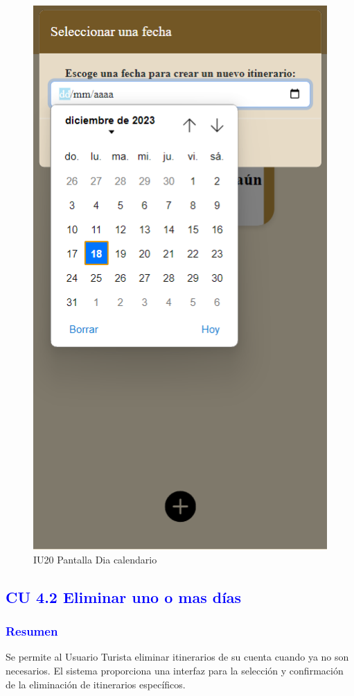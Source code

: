 \begin{figure}[htbp] 
        \centering
        \includegraphics[width=.5\linewidth]{entregable final/pantallasSistema/IU20 Pantalla Dia calendario.png}
        \caption{IU20 Pantalla Dia calendario}
        \label{fig:enter-label}
\end{figure}








\newpage
\subsection{\textcolor{blue}{CU 4.2 Eliminar uno o mas días}}
\subsubsection{\textcolor{blue}{Resumen}}
Se permite al Usuario Turista eliminar itinerarios de su cuenta cuando ya no son necesarios. El sistema proporciona una interfaz para la selección y confirmación de la eliminación de itinerarios
específicos.

